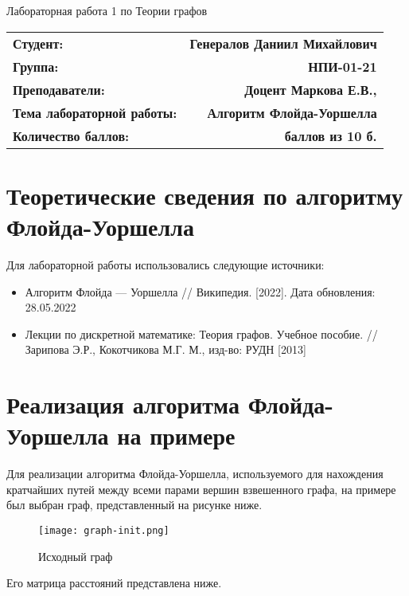 \documentclass{article}
\begin{document}
\begin{center}
    \begin{large}
        Лабораторная работа 1 по Теории графов
    \end{large}
\end{center}

\begin{tabular}{lr}
    \textbf{Студент:} & \textbf{Генералов Даниил Михайлович} \\
    \textbf{Группа:} & \textbf{НПИ-01-21} \\
    \textbf{Преподаватели:} & \textbf{Доцент Маркова Е.В.,} \\
    \textbf{Тема лабораторной работы:} & \textbf{Алгоритм Флойда-Уоршелла} \\
    \textbf{Количество баллов:} & \textbf{\underline{    } баллов из 10 б.} \\
\end{tabular}

\section{Теоретические сведения по алгоритму Флойда-Уоршелла}

Для лабораторной работы использовались следующие источники:
\begin{itemize}
    \item Алгоритм Флойда — Уоршелла // Википедия. [2022]. Дата обновления: 28.05.2022
    \item Лекции по дискретной математике: Теория графов. Учебное пособие. // Зарипова Э.Р., Кокотчикова М.Г. М., изд-во: РУДН [2013]
\end{itemize}

\section{Реализация алгоритма Флойда-Уоршелла на примере}

Для реализации алгоритма Флойда-Уоршелла, используемого для нахождения кратчайших путей между всеми парами вершин взвешенного графа,
на примере был выбран граф, представленный на рисунке ниже.

\begin{figure}[h]
    \centering
    \texttt{[image: graph-init.png]}
    \caption{Исходный граф}
\end{figure}

Его матрица расстояний представлена ниже.
\end{document}
